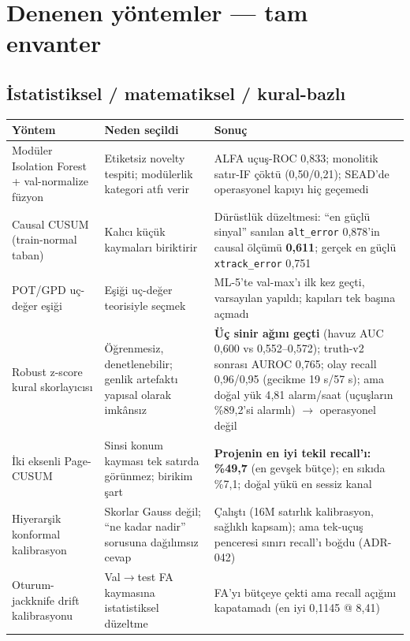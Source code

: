 \documentclass[11pt,a4paper]{article}
\newcommand{\code}[1]{\texttt{\small #1}}
\newcommand{\gatepass}[1]{\textcolor{okgreen}{\textbf{#1}}}
\begin{document}
\section{Denenen yöntemler --- tam envanter}

\subsection{İstatistiksel / matematiksel / kural-bazlı}

\begin{small}
\begin{longtable}{@{}p{}p{}p{}@{}}
\toprule
\textbf{Yöntem} & \textbf{Neden seçildi} & \textbf{Sonuç} \\
\midrule
\endhead
Modüler Isolation Forest + val-normalize füzyon &
Etiketsiz novelty tespiti; modülerlik kategori atfı verir &
ALFA uçuş-ROC 0{,}833; monolitik satır-IF çöktü (0{,}50/0{,}21); SEAD'de
operasyonel kapıyı hiç geçemedi \\
\addlinespace
Causal CUSUM (train-normal taban) &
Kalıcı küçük kaymaları biriktirir &
Dürüstlük düzeltmesi: ``en güçlü sinyal'' sanılan \code{alt\_error} 0{,}878'in
causal ölçümü \textbf{0{,}611}; gerçek en güçlü \code{xtrack\_error} 0{,}751 \\
\addlinespace
POT/GPD uç-değer eşiği &
Eşiği uç-değer teorisiyle seçmek &
ML-5'te val-max'ı ilk kez geçti, varsayılan yapıldı; kapıları tek başına açmadı \\
\addlinespace
Robust z-score kural skorlayıcısı &
Öğrenmesiz, denetlenebilir; genlik artefaktı yapısal olarak imkânsız &
\gatepass{Üç sinir ağını geçti} (havuz AUC 0{,}600 vs 0{,}552--0{,}572); truth-v2
sonrası AUROC 0{,}765; olay recall 0{,}96/0{,}95 (gecikme 19 s/57 s); ama doğal yük
4{,}81 alarm/saat (uçuşların \%89{,}2'si alarmlı) $\to$ operasyonel değil \\
\addlinespace
İki eksenli Page-CUSUM &
Sinsi konum kayması tek satırda görünmez; birikim şart &
\gatepass{Projenin en iyi tekil recall'ı: \%49{,}7} (en gevşek bütçe); en sıkıda
\%7{,}1; doğal yükü en sessiz kanal \\
\addlinespace
Hiyerarşik konformal kalibrasyon &
Skorlar Gauss değil; ``ne kadar nadir'' sorusuna dağılımsız cevap &
Çalıştı (16M satırlık kalibrasyon, sağlıklı kapsam); ama tek-uçuş penceresi sınırı
recall'ı boğdu (ADR-042) \\
\addlinespace
Oturum-jackknife drift kalibrasyonu &
Val$\to$test FA kaymasına istatistiksel düzeltme &
FA'yı bütçeye çekti ama recall açığını kapatamadı (en iyi 0{,}1145 @ 8{,}41) \\
\bottomrule
\end{longtable}
\end{small}
\end{document}
